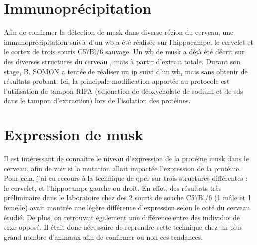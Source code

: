 \section{Immunoprécipitation}
\label{sec:IPresultat}
Afin de confirmer la détection de \gls{musk} dans diverse région du cerveau, une immunoprécipitation suivie d'un \gls{wb} a été réalisée sur l'hippocampe, le cervelet et le cortex de trois souris C57Bl/6 sauvage. Un \gls{wb} de \gls{musk} a déjà été décrit sur des diverses structures du cerveau \cite{Garcia-Osta2006}, mais à partir d'extrait totale. Durant son stage, B. SOMON a tentée de réaliser un \gls{ip} suivi d'un \gls{wb}, mais sans obtenir de résultats probant. Ici, la principale modification apportée au protocole est l'utilisation de tampon RIPA (adjonction de déoxycholate de sodium et de \acrshort{sds} dans le tampon d'extraction) lors de l'isolation des protéines.

\section{Expression de \gls{musk}}
Il est intéressant de connaître le niveau d'expression de la protéine \gls{musk} dans le cerveau, afin de voir si la mutation allait impactée l'expression de la protéine. Pour cela, j'ai eu recours à la technique de \gls{qpcr} sur trois structures différentes : le cervelet, et l'hippocampe gauche ou droit. En effet, des résultats très préliminaire dans le laboratoire chez des 2 souris de souche C57Bl/6 (1 mâle et 1 femelle) avait montrée une légère différence d'expression selon le coté du cerveau étudié. De plus, on retrouvait également une différence entre des individus de sexe opposé. Il était donc nécessaire de reprendre cette technique chez un plus grand nombre d'animaux afin de confirmer ou non ces tendances.